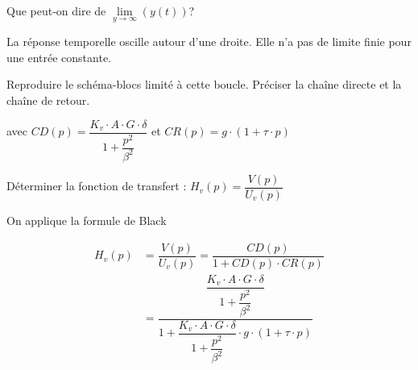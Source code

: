 \begin{Exo}[name={Devoir},title={Système de pendulation},origin={Adapté de Centrale MP 2000},label={exo:CentralePendulation}]
\begin{Cor}
\begin{multicols}{2}
\sq Que peut-on dire de $\lim\limits_{y\to\infty}(y(t))$?

La réponse temporelle oscille autour d'une droite. Elle n'a pas de limite finie pour une entrée constante.









\qst Reproduire le schéma-blocs limité à cette boucle. Préciser la chaîne directe et la chaîne de retour.


{\smaller
{}\par
}

avec $CD(p)=\dfrac{K_v\cdot A\cdot G\cdot \delta}{1+\dfrac{p^2}{\beta^2}}$  et $CR(p)=g\cdot(1+\tau\cdot p)$



\qst Déterminer la fonction de transfert : $H_v(p)=\dfrac{V(p)}{U_v(p)}$



On applique la formule de Black

\begin{align*}
H_v(p)&=\dfrac{V(p)}{U_v(p)}=\dfrac{CD(p)}{1+CD(p)\cdot CR(p)}\\
&=\dfrac{\dfrac{K_v\cdot A\cdot G\cdot \delta}{1+\dfrac{p^2}{\beta^2}}}{1+\dfrac{K_v\cdot A\cdot G\cdot \delta}{1+\dfrac{p^2}{\beta^2}}\cdot g\cdot(1+\tau\cdot p)}
\end{align*}



\end{multicols}
\end{Cor}
\end{Exo}
